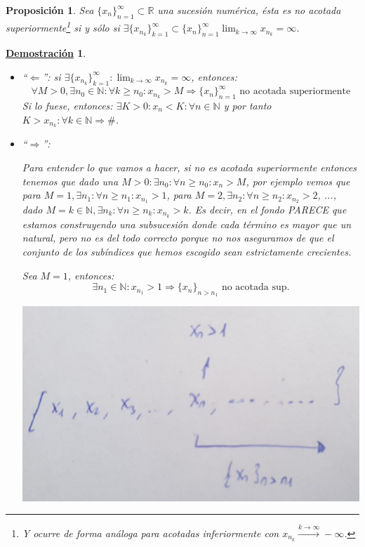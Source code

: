 \documentclass[10pt,a4paper,openright]{book}
\theoremstyle{break}
\newtheorem{prop}{Proposición}[chapter]
\newtheorem*{demo}{\underline{Demostración}}
\begin{document}
\begin{prop}
Sea $\{x_n\}_{n=1}^\infty\subset \mathbb R$ una sucesión numérica, ésta es no acotada superiormente\footnote{Y ocurre de forma análoga para acotadas inferiormente con $x_{n_k}\xrightarrow{k\rightarrow \infty} -\infty$.} si y sólo si $\exists \{x_{n_k}\}_{k=1}^\infty\subset \{x_n\}_{n=1}^\infty \lim_{k\rightarrow \infty} x_{n_k}=\infty$.
\end{prop}
\begin{demo}
\begin{itemize}
\item ``$\Leftarrow$'': si $\exists \{x_{n_k}\}_{k=1}^\infty : \lim_{k\rightarrow \infty}x_{n_k}=\infty$, entonces:
$$\forall M>0, \exists n_0\in \mathbb N: \forall k\geq n_0: x_{n_k}>M\Rightarrow \{x_n\}_{n=1}^\infty\mbox{ no acotada superiormente}$$
Si lo fuese, entonces: $\exists K>0: x_n<K: \forall n\in \mathbb N$ y por tanto $K>x_{n_k}: \forall k\in \mathbb N\Rightarrow \#$.

\item ``$\Rightarrow$'':\par
Para entender lo que vamos a hacer, si no es acotada superiormente entonces tenemos que dado una $M>0:\exists n_0:\forall n\geq n_0: x_n>M$, por ejemplo vemos que para $M=1, \exists n_1:\forall n\geq n_1: x_{n_1}>1$, para $M=2, \exists n_2:\forall n\geq n_2: x_{n_2}>2$, ..., dado $M=k\in \mathbb N, \exists n_k:\forall n\geq n_k: x_{n_k}>k$. Es decir, en el fondo PARECE que estamos construyendo una subsucesión donde cada término es mayor que un natural, pero no es del todo correcto porque no nos aseguramos de que el conjunto de los subíndices que hemos escogido sean estrictamente crecientes.

\par Sea $M=1$, entonces:
$$\exists n_1\in \mathbb N: x_{n_1}>1\Rightarrow \{x_n\}_{n>n_1} \mbox{ no acotada sup.}$$

\begin{center}
\includegraphics[scale=0.15]{proposicion subsucesiones}
\end{center}


\end{itemize}
\end{demo}
\end{document}
